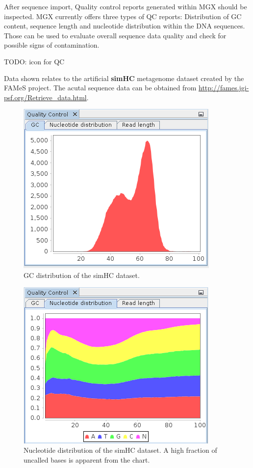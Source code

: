 After sequence import, Quality control reports generated within MGX should be inspected. 
MGX currently offers three types of QC reports: Distribution of GC content, sequence length
and nucleotide distribution within the DNA sequences. Those can be used to evaluate overall
sequence data quality and check for possible signs of contamination.

TODO: icon for QC

Data shown relates to the artificial \textbf{simHC} metagenome dataset created by the
FAMeS\cite{SIMMETA} project. The acutal sequence data can be obtained from \url{http://fames.jgi-psf.org/Retrieve_data.html}.

\begin{figure}[H]
\centering
\includegraphics[width=.8\textwidth]{img/mgx/QCgc}
\caption[Quality control]{GC distribution of the simHC dataset.}
\label{qc1}
\end{figure}

\begin{figure}[H]
\centering
\includegraphics[width=.8\textwidth]{img/mgx/QCnuc}
\caption[Quality control]{Nucleotide distribution of the simHC dataset. A high fraction of uncalled bases
is apparent from the chart.}
\label{qc2}
\end{figure}

